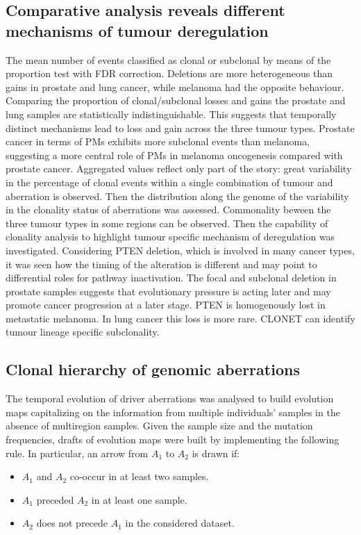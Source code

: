 	\subsection{Comparative analysis reveals different mechanisms of tumour deregulation}
	The mean number of events classified as clonal or subclonal by means of the proportion test with FDR correction.
	Deletions are more heterogeneous than gains in prostate and lung cancer, while melanoma had the opposite behaviour.
	Comparing the proportion of clonal/subclonal losses and gains the prostate and lung samples are statistically indistinguishable.
	This suggests that temporally distinct mechanisms lead to loss and gain across the three tumour types.
	Prostate cancer in terms of PMs exhibits more subclonal events than melanoma, suggesting a more central role of PMs in melanoma oncogenesis compared with prostate cancer.
	Aggregated values reflect only part of the story: great variability in the percentage of clonal events within a single combination of tumour and aberration is observed.
	Then the distribution along the genome of the variability in the clonality status of aberrations was assessed.
	Commonality beween the three tumour types in some regions can be observed.
	Then the capability of clonality analysis to highlight tumour specific mechanism of deregulation was investigated.
	Considering PTEN deletion, which is involved in many cancer types, it was seen how the timing of the alteration is different and may point to differential roles for pathway inactivation.
	The focal and subclonal deletion in prostate samples suggests that evolutionary pressure is acting later and may promote cancer progression at a later stage.
	PTEN is homogenously lost in metastatic melanoma.
	In lung cancer this loss is more rare.
	CLONET can identify tumour lineage specific subclonality.

	\subsection{Clonal hierarchy of genomic aberrations}
	The temporal evolution of driver aberrations was analysed to build evolution maps capitalizing on the information from multiple individuals' samples in the absence of multiregion samples.
	Given the sample size and the mutation frequencies, drafts of evolution maps were built by implementing the following rule.
	In particular, an arrow from $A_1$ to $A_2$ is drawn if:

	\begin{multicols}{2}
		\begin{itemize}
			\item $A_1$ and $A_2$ co-occur in at least two samples.
			\item $A_1$ preceded $A_2$ in at least one sample.
			\item $A_2$ does not precede $A_1$ in the considered dataset.
		\end{itemize}
	\end{multicols}

